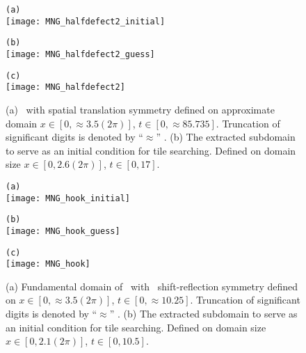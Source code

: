 \begin{description}
\begin{figure}
\begin{minipage}[height=.4\textheight]{.5\textwidth}
\centering
\small{\texttt{(a)}} \\
\texttt{[image: MNG\_halfdefect2\_initial]}
\end{minipage}
\begin{minipage}[height=.4\textheight]{.5\textwidth}
\centering
\small{\texttt{(b)}}\\
\texttt{[image: MNG\_halfdefect2\_guess]}
\end{minipage}
\begin{minipage}[height=.1\textheight]{\textwidth}
\centering
\small{\texttt{(c)}}\\
\texttt{[image: MNG\_halfdefect2]}
\end{minipage}
\caption{ \label{fig:halfdefect2}
(a) \twoT\ with spatial translation symmetry defined on approximate domain $x \in [0,\approx 3.5(2\pi)]$, $t \in [0, \approx 85.735]$.  Truncation of significant digits is denoted by ``$\approx$'' .
(b) The extracted subdomain to serve as an
initial condition for tile searching. Defined on domain size $x \in [0,2.6(2\pi)]$, $t \in [0, 17]$.
}
\end{figure}

\begin{figure}
\begin{minipage}[height=.1\textheight]{.5\textwidth}
\centering
\small{\texttt{(a)}} \\
\texttt{[image: MNG\_hook\_initial]}
\end{minipage}
\begin{minipage}[height=.1\textheight]{.5\textwidth}
\centering
\small{\texttt{(b)}} \\
\texttt{[image: MNG\_hook\_guess]}
\end{minipage}
\begin{minipage}[height=.1\textheight]{\textwidth}
\centering
\small{\texttt{(c)}}\\
\texttt{[image: MNG\_hook]}
\end{minipage}
\caption{ \label{fig:hook}
(a) Fundamental domain of \twoT\ with \spt\
shift-reflection symmetry defined on $x \in [0,\approx 3.5(2\pi)]$, $t \in [0, \approx 10.25]$.  Truncation of significant digits is denoted by ``$\approx$'' .
(b) The extracted subdomain to serve as an
initial condition for tile searching. Defined on domain size $x \in [0,2.1(2\pi)]$, $t \in [0, 10.5]$.
}
\end{figure}



\end{description}
